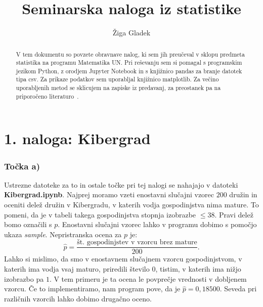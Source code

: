 \documentclass[12pt, letterpaper]{article}
\title{Seminarska naloga iz statistike}
\author{Žiga Gladek}
\begin{document}
\maketitle

\renewcommand{\abstractname}{Povzetek}
\begin{abstract}
V tem dokumentu so povzete obravnave nalog, ki sem jih preučeval v sklopu predmeta statistika na programu Matematika UN. Pri reševanju sem si pomagal s programskim jezikom Python, z orodjem Jupyter Notebook in s knjižnico pandas za branje datotek tipa csv. Za prikaze podatkov sem uporabljal knjižnico matplotlib. Za večino uporabljenih metod se sklicujem na zapiske iz predavanj, za preostanek pa na priporočeno literaturo~\cite{Rice}.
\end{abstract}

\section*{1. naloga: Kibergrad}

\subsubsection*{Točka a)} Ustrezne datoteke za to in ostale točke pri tej nalogi se nahajajo v datoteki \textbf{Kibergrad.ipynb}. Najprej moramo vzeti enostavni slučajni vzorec $200$ družin in oceniti delež družin v Kibergradu, v katerih vodja gospodinjstva nima mature. To pomeni, da je v tabeli takega gospodinjstva stopnja izobrazbe $\leq 38$. Pravi delež bomo označili s $p$. Enostavni slučajni vzorec lahko v programu dobimo s pomočjo ukaza \emph{sample}. Nepristranska ocena za $p$ je:
\[
\hat{p} = \frac{\text{št. gospodinjstev v vzorcu brez mature}}{200}.
\]
Lahko si mislimo, da smo v enostavnem slučajnem vzorcu gospodinjstvom, v katerih ima vodja vsaj maturo, priredili število $0$, tistim, v katerih ima nižjo izobrazbo pa $1$. V tem primeru je ta ocena le povprečje vrednosti v dobljenem vzorcu. Če to implementiramo, nam program pove, da je $\hat{p} = 0,18500$. Seveda pri različnih vzorcih lahko dobimo drugačno oceno.
\end{document}
